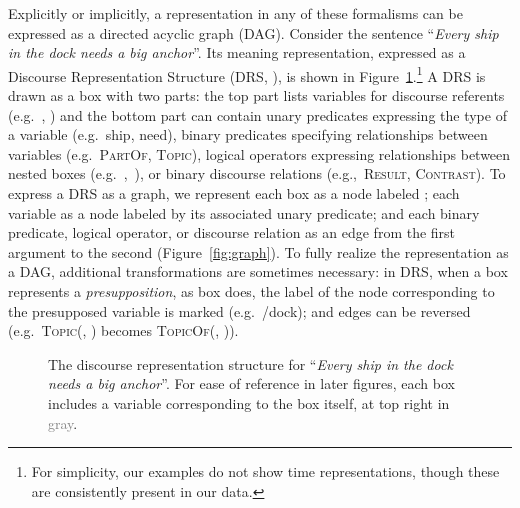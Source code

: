 \documentclass[11pt,a4paper]{article}
\theoremstyle{plain}
\begin{document}
Explicitly or implicitly, a representation in any of these formalisms can be expressed as a directed acyclic graph (DAG). Consider the sentence ``\textsl{Every ship in the dock needs a big anchor}''. Its meaning representation, expressed as a Discourse Representation Structure (DRS, \citealt{kamp1981theory}), is shown in Figure~\ref{fig:drs}.\footnote{For simplicity, our examples do not show time representations, though these are consistently present in our data.} A DRS is drawn as a box with two parts: the top part lists variables for discourse referents (e.g.~, ) and the bottom part can contain unary predicates expressing the type of a variable (e.g.~ship, need), binary predicates specifying relationships between variables (e.g.~\textsc{PartOf}, \textsc{Topic}), logical operators expressing relationships between nested boxes (e.g.~,~), or binary discourse relations (e.g.,~\textsc{Result}, \textsc{Contrast}). To express a DRS as a graph, we represent each box as a node labeled ; each variable as a node labeled by its associated unary predicate; and each binary predicate, logical operator, or discourse relation as an edge from the first argument to the second (Figure~\ref{fig:graph}). To fully realize the representation as a DAG, additional transformations are sometimes necessary: in DRS, when a box represents a \emph{presupposition}, as box  does, the label of the node corresponding to the presupposed variable is marked (e.g.~/dock); and edges can be reversed (e.g.~\textsc{Topic}(, ) becomes \textsc{TopicOf}(, )).

\begin{figure}\footnotesize
{} 
\caption{The discourse representation structure for ``\textsl{Every
    ship in the dock needs a big anchor}''. For ease of reference in
  later figures, each box includes a variable corresponding to the box itself, at top right in \textcolor{gray}{gray}.}\label{fig:drs}
\end{figure}
\end{document}
